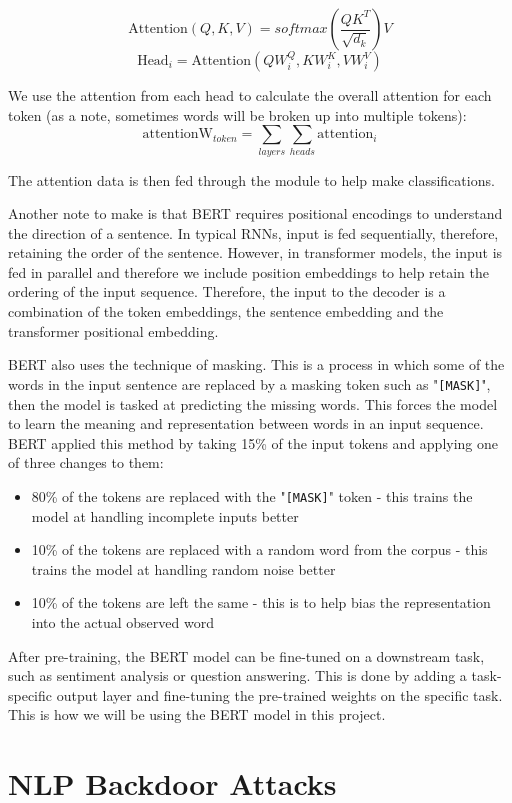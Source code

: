 $$
\text{Attention}(Q,K,V) = softmax \left( \frac{QK^T}{\sqrt{d_k} } \right) V
$$
$$
\text{Head}_i = \text{Attention}(QW_i^Q, KW_i^K, VW_i^V)
$$

We use the attention from each head to calculate the overall attention for each token (as a note, sometimes words will be broken up into multiple tokens):
$$
\text{attentionW}_{token} = \sum_{layers}\sum_{heads} \text{attention}_i
$$

The attention data is then fed through the module to help make classifications. 

Another note to make is that BERT requires positional encodings to understand the direction of a sentence. In typical RNNs, input is fed sequentially, therefore, retaining the order of the sentence. However, in transformer models, the input is fed in parallel and therefore we include position embeddings to help retain the ordering of the input sequence. Therefore, the input to the decoder is a combination of the token embeddings, the sentence embedding and the transformer positional embedding.

BERT also uses the technique of masking. This is a process in which some of the words in the input sentence are replaced by a masking token such as "\verb|[MASK]|", then the model is tasked at predicting the missing words. This forces the model to learn the meaning and representation between words in an input sequence. BERT applied this method by taking 15\% of the input tokens and applying one of three changes to them:

\begin{itemize}
    \item 80\% of the tokens are replaced with the "\verb|[MASK]|" token - this trains the model at handling incomplete inputs better
    \item 10\% of the tokens are replaced with a random word from the corpus - this trains the model at handling random noise better
    \item 10\% of the tokens are left the same - this is to help bias the representation into the actual observed word
\end{itemize} 

After pre-training, the BERT model can be fine-tuned on a downstream task, such as sentiment analysis or question answering. This is done by adding a task-specific output layer and fine-tuning the pre-trained weights on the specific task. This is how we will be using the BERT model in this project.


\section{NLP Backdoor Attacks}

